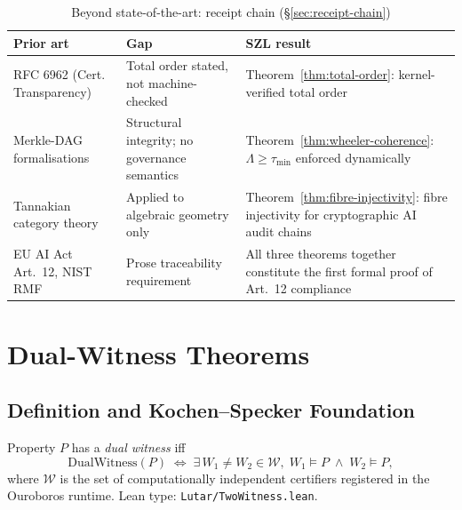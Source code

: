\bsota
\label{bsota:receipt-chain}

\begin{table}[h!]
\centering\small
\caption{Beyond state-of-the-art: receipt chain (\S\ref{sec:receipt-chain})}
\label{tab:bsota-receipt}
\begin{tabular}{p{3.5cm}p{3.8cm}p{5cm}}
\hline
\textbf{Prior art} & \textbf{Gap} & \textbf{SZL result} \\
\hline
RFC 6962 (Cert. Transparency) & Total order stated, not machine-checked & Theorem~\ref{thm:total-order}: kernel-verified total order \\
Merkle-DAG formalisations & Structural integrity; no governance semantics & Theorem~\ref{thm:wheeler-coherence}: $\Lambda \ge \tau_{\min}$ enforced dynamically \\
Tannakian category theory & Applied to algebraic geometry only & Theorem~\ref{thm:fibre-injectivity}: fibre injectivity for cryptographic AI audit chains \\
EU AI Act Art.~12, NIST RMF & Prose traceability requirement & All three theorems together constitute the first formal proof of Art.~12 compliance \\
\hline
\end{tabular}
\end{table}

\section{Dual-Witness Theorems}
\label{sec:dual-witness}

\subsection{Definition and Kochen--Specker Foundation}
\label{subsec:dw-definition}

\begin{definition}
\label{def:dual-witness}
Property $P$ has a \emph{dual witness} iff
\begin{equation}
  \mathrm{DualWitness}(P) \;\iff\;
  \exists\, W_1 \ne W_2 \in \mathcal{W},\;
  W_1 \vDash P \;\wedge\; W_2 \vDash P,
  \label{eq:dual-witness}
\end{equation}
where $\mathcal{W}$ is the set of computationally independent certifiers
registered in the Ouroboros runtime.
\textup{Lean type:} \texttt{Lutar/TwoWitness.lean}.
\end{definition}

